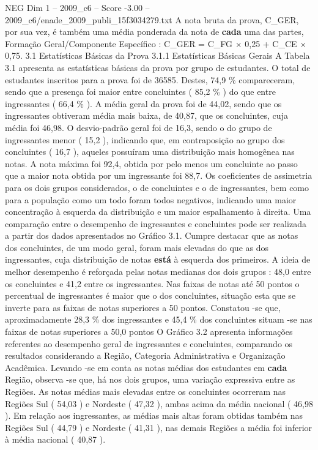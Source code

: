 \begin{textsample}{NEG Dim 1 – 2009\_c6 – Score -3.00 – 2009\_c6/enade\_2009\_publi\_15f3034279.txt}
A nota bruta da prova, C\_GER, por sua vez, é também uma média ponderada da nota de \textbf{cada} uma das partes, Formação Geral/Componente Específico : C\_GER = C\_FG × 0,25 + C\_CE × 0,75. 3.1 Estatísticas Básicas da Prova 3.1.1 Estatísticas Básicas Gerais A Tabela 3.1 apresenta as estatísticas básicas da prova por grupo de estudantes.
O total de estudantes inscritos para a prova foi de 36585.
Destes, 74,9 \% compareceram, sendo que a presença foi maior entre concluintes ( 85,2 \% ) do que entre ingressantes ( 66,4 \% ).
A média geral da prova foi de 44,02, sendo que os ingressantes obtiveram média mais baixa, de 40,87, que os concluintes, cuja média foi 46,98.
O desvio-padrão geral foi de 16,3, sendo o do grupo de ingressantes menor ( 15,2 ), indicando que, em contraposição ao grupo dos concluintes ( 16,7 ), aqueles possuíram uma distribuição mais homogênea nas notas.
A nota máxima foi 92,4, obtida por pelo menos um concluinte ao passo que a maior nota obtida por um ingressante foi 88,7.
Os coeficientes de assimetria para os dois grupos considerados, o de concluintes e o de ingressantes, bem como para a população como um todo foram todos negativos, indicando uma maior concentração à esquerda da distribuição e um maior espalhamento à direita.
Uma comparação entre o desempenho de ingressantes e concluintes pode ser realizada a partir dos dados apresentados no Gráfico 3.1.
Cumpre destacar que as notas dos concluintes, de um modo geral, foram mais elevadas do que as dos ingressantes, cuja distribuição de notas \textbf{está} à esquerda dos primeiros.
A ideia de melhor desempenho é reforçada pelas notas medianas dos dois grupos : 48,0 entre os concluintes e 41,2 entre os ingressantes.
Nas faixas de notas até 50 pontos o percentual de ingressantes é maior que o dos concluintes, situação esta que se inverte para as faixas de notas superiores a 50 pontos.
Constatou -se que, aproximadamente 28,3 \% dos ingressantes e 45,4 \% dos concluintes situam -se nas faixas de notas superiores a 50,0 pontos O Gráfico 3.2 apresenta informações referentes ao desempenho geral de ingressantes e concluintes, comparando os resultados considerando a Região, Categoria Administrativa e Organização Acadêmica.
Levando -se em conta as notas médias dos estudantes em \textbf{cada} Região, observa -se que, há nos dois grupos, uma variação expressiva entre as Regiões.
As notas médias mais elevadas entre os concluintes ocorreram nas Regiões Sul ( 54,03 ) e Nordeste ( 47,32 ), ambas acima da média nacional ( 46,98 ).
Em relação aos ingressantes, as médias mais altas foram obtidas também nas Regiões Sul ( 44,79 ) e Nordeste ( 41,31 ), nas demais Regiões a média foi inferior à média nacional ( 40,87 ).

\end{textsample}
